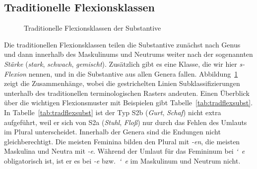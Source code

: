 \subsection{Traditionelle Flexionsklassen}

\label{sec:nominaflexionsklassen}

\begin{figure}[!htbp]
  \caption{Traditionelle Flexionsklassen der Substantive}
  \label{fig:substflexklassen}
\end{figure}

Die traditionellen Flexionsklassen teilen die Substantive zunächst nach Genus und dann innerhalb des Maskulinums und Neutrums weiter nach der sogenannten \textit{Stärke} (\textit{stark}, \textit{schwach}, \textit{gemischt}).
Zusätzlich gibt es eine Klasse, die wir hier \textit{s-Flexion} nennen, und in die Substantive aus allen Genera fallen.
Abbildung~\ref{fig:substflexklassen} zeigt die Zusammenhänge, wobei die gestrichelten Linien Subklassifizierungen unterhalb des traditionellen terminologischen Rasters andeuten.
Einen Überblick über die wichtigen Flexionsmuster mit Beispielen gibt Tabelle~\ref{tab:tradflexsubst}.
In Tabelle~\ref{tab:tradflexsubst} ist der Typ S2b (\textit{Gurt}, \textit{Schaf}) nicht extra aufgeführt, weil er sich von S2a (\textit{Stuhl}, \textit{Floß}) nur durch das Fehlen des Umlauts im Plural unterscheidet.
Innerhalb der Genera sind die Endungen nicht gleichberechtigt.
Die meisten Feminina bilden den Plural mit \textit{-en}, die meisten Maskulina und Neutra mit \textit{-e}.
Während der Umlaut für das Femininum bei \textit{\char`~e} obligatorisch ist, ist er es bei \textit{-e} bzw.\ \textit{\char`~e} im Maskulinum und Neutrum nicht.


